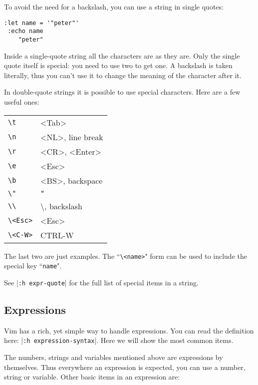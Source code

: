 To avoid the need for a backslash, you can use a string in single quotes:

\begin{Verbatim}[samepage=true]
 :let name = '"peter"'
 :echo name
    "peter"
\end{Verbatim}

Inside a single-quote string all the characters are as they are.
Only the single quote itself is special: you need to use two to get one.
A backslash is taken literally, thus you can't use it to change the meaning of the character after it.

In double-quote strings it is possible to use special characters.
Here are a few useful ones:

\begin{center} \begin{tabular}{l l}
		\texttt{\textbackslash{}t} & <Tab> \\
		\texttt{\textbackslash{}n} & <NL>, line break \\
		\texttt{\textbackslash{}r} & <CR>, <Enter> \\
		\texttt{\textbackslash{}e} & <Esc> \\
		\texttt{\textbackslash{}b} & <BS>, backspace \\
		\texttt{\textbackslash{}"} & \texttt{"} \\
		\texttt{\textbackslash{}\textbackslash{}} & \textbackslash{}, backslash \\
		\texttt{\textbackslash{}<Esc>} & <Esc> \\
		\texttt{\textbackslash{}<C-W>} & CTRL-W \\
\end{tabular} \end{center}

The last two are just examples.
The  ``\texttt{\textbackslash{}<name>}" form can be used to include the special key ``\texttt{name}".

See |\texttt{:h expr-quote}| for the full list of special items in a string.
\subsection{Expressions}
Vim has a rich, yet simple way to handle expressions.
You can read the definition here: |\texttt{:h expression-syntax}|.
Here we will show the most common items.

The numbers, strings and variables mentioned above are expressions by themselves.
Thus everywhere an expression is expected, you can use a number, string or variable.
Other basic items in an expression are:

